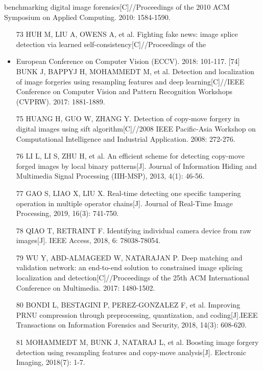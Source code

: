 \documentclass{article}
\begin{document}
benchmarking digital image forensics[C]//Proceedings of the 2010 ACM Symposium on Applied Computing. 2010: 1584-1590.
\begin{itemize}
\item 
[73] HUH M, LIU A, OWENS A, et al. Fighting fake news: image splice detection via learned self-consistency[C]//Proceedings of the

\item 
European Conference on Computer Vision (ECCV). 2018: 101-117. [74] BUNK J, BAPPYJ H, MOHAMMEDT M, et al. Detection and localization of image forgeries using resampling features and deep learning[C]//IEEE Conference on Computer Vision and Pattern Recognition Workshops (CVPRW). 2017: 1881-1889.

\item 
[75] HUANG H, GUO W, ZHANG Y. Detection of copy-move forgery in digital images using sift algorithm[C]//2008 IEEE Pacific-Asia Workshop on Computational Intelligence and Industrial Application. 2008: 272-276.

\item 
[76] LI L, LI S, ZHU H, et al. An efficient scheme for detecting copy-move forged images by local binary patterns[J]. Journal of Information Hiding and Multimedia Signal Processing (IIH-MSP), 2013, 4(1): 46-56.

\item 
[77] GAO S, LIAO X, LIU X. Real-time detecting one specific tampering operation in multiple operator chains[J]. Journal of Real-Time Image Processing, 2019, 16(3): 741-750.

\item 
[78] QIAO T, RETRAINT F. Identifying individual camera device from raw images[J]. IEEE Access, 2018, 6: 78038-78054.

\item 
[79] WU Y, ABD-ALMAGEED W, NATARAJAN P. Deep matching and validation network: an end-to-end solution to constrained image splicing localization and detection[C]//Proceedings of the 25th ACM International Conference on Multimedia. 2017: 1480-1502.

\item 
[80] BONDI L, BESTAGINI P, PEREZ-GONZALEZ F, et al. Improving PRNU compression through preprocessing, quantization, and coding[J].IEEE Transactions on Information Forensics and Security, 2018, 14(3): 608-620.

\item 
[81] MOHAMMEDT M, BUNK J, NATARAJ L, et al. Boosting image forgery detection using resampling features and copy-move analysis[J]. Electronic Imaging, 2018(7): 1-7.


\end{itemize}
\end{document}
